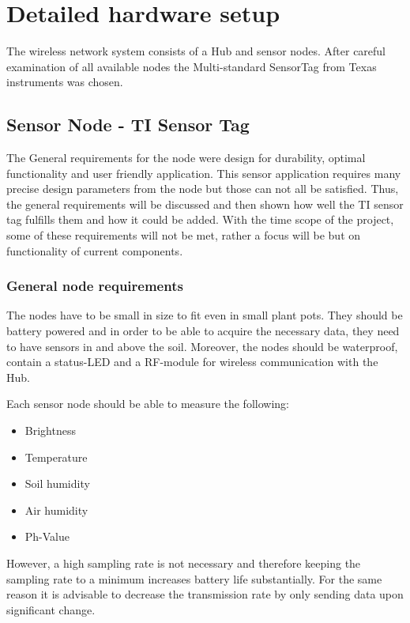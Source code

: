 \section{Detailed hardware setup}

The wireless network system consists of a Hub and sensor nodes. After careful examination of all available nodes the Multi-standard SensorTag from Texas instruments \cite{TIsensortag} was chosen.


\subsection{Sensor Node - TI Sensor Tag}

The General requirements for the node were design for durability, optimal functionality and user friendly application. This sensor application requires many precise design parameters from the node but those can not all be satisfied. Thus, the general requirements will be discussed and then shown how well the TI sensor tag fulfills them and how it could be added. With the time scope of the project, some of these requirements will not be met, rather a focus will be but on functionality of current components.

\subsubsection{General node requirements}

The nodes have to be small in size to fit even in small plant pots. They should be battery powered and in order to be able to acquire the necessary data, they need to have sensors in and above the soil. Moreover, the nodes should be waterproof, contain a status-LED and a RF-module for wireless communication with the Hub.

Each sensor node should be able to measure the following:
\begin{itemize}
	\item Brightness 
	\item Temperature
	\item Soil humidity
	\item Air humidity
	\item Ph-Value
\end{itemize}



However, a high sampling rate is not necessary and therefore keeping the sampling rate to a minimum increases battery life substantially. For the same reason it is advisable to decrease the transmission rate by only sending data upon significant change.

